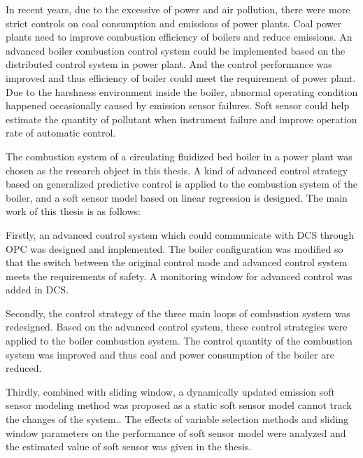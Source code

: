 \begin{enabstract}
In recent years, due to the excessive of power and air pollution, there were more strict controls on coal consumption and emissions of power plants. Coal power plants need to improve combustion efficiency of boilers and reduce emissions. An advanced boiler combustion control system could be implemented based on the distributed control system in power plant. And the control performance was improved and thus efficiency of boiler could meet the requirement of power plant. Due to the harshness environment inside the boiler, abnormal operating condition happened occasionally caused by emission sensor failures. Soft sensor could help estimate the quantity of pollutant when instrument failure and improve operation rate of automatic control.

The combustion system of a circulating fluidized bed boiler in a power plant was chosen as the research object in this thesis. A kind of advanced control strategy based on generalized predictive control is applied to the combustion system of the boiler, and a  soft sensor model based on linear regression is designed. The main work of this thesis is as follows:

Firstly, an advanced control system which could communicate with DCS through OPC was designed and implemented. The boiler configuration was modified so that the switch between the original control mode and advanced control system meets the requirements of safety. A monitoring window for advanced control was added in DCS.

Secondly, the control strategy of the three main loops of combustion system was redesigned. Based on the advanced control system, these control strategies were applied to the boiler combustion system. The control quantity of the combustion system was improved and thus coal and power consumption of the boiler are reduced.

Thirdly, combined with sliding window, a dynamically updated  emission soft sensor modeling method was proposed as a static soft sensor model cannot track the changes of the system.. The effects of variable selection methods and sliding window parameters on the performance of soft sensor model were analyzed and the estimated value of soft sensor was given in the thesis. 

\end{enabstract}
